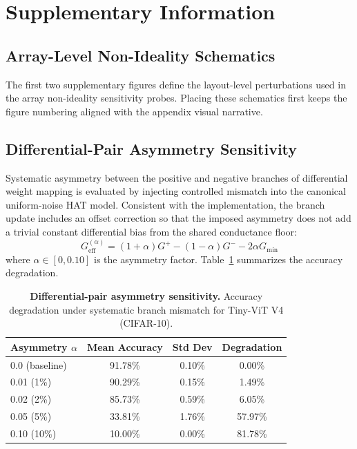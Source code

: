 \section{Supplementary Information}
\label{sec:supplementary}

\subsection{Array-Level Non-Ideality Schematics}
\label{subsec:supp-array-schematics}

The first two supplementary figures define the layout-level perturbations used in the array non-ideality sensitivity probes. Placing these schematics first keeps the figure numbering aligned with the appendix visual narrative.

\subsection{Differential-Pair Asymmetry Sensitivity}
\label{subsec:supp-asymmetry-sensitivity}

Systematic asymmetry between the positive and negative branches of differential weight mapping is evaluated by injecting controlled mismatch into the canonical uniform-noise HAT model. Consistent with the implementation, the branch update includes an offset correction so that the imposed asymmetry does not add a trivial constant differential bias from the shared conductance floor:
\begin{equation}
G^{(\alpha)}_{\mathrm{eff}} = (1+\alpha)G^{+} - (1-\alpha)G^{-} - 2\alpha G_{\min}
\end{equation}
where $\alpha \in [0, 0.10]$ is the asymmetry factor. Table~\ref{tab:asymmetry-sensitivity} summarizes the accuracy degradation.

\begin{table}[ht]
\centering
\caption{\textbf{Differential-pair asymmetry sensitivity.} Accuracy degradation under systematic branch mismatch for Tiny-ViT V4 (CIFAR-10).}
\label{tab:asymmetry-sensitivity}
\begin{tabular}{@{}lccc@{}}
\toprule
\textbf{Asymmetry $\alpha$} & \textbf{Mean Accuracy} & \textbf{Std Dev} & \textbf{Degradation} \\
\midrule
0.0 (baseline) & 91.78\% & 0.10\% & 0.00\% \\
0.01 (1\%) & 90.29\% & 0.15\% & 1.49\% \\
0.02 (2\%) & 85.73\% & 0.59\% & 6.05\% \\
0.05 (5\%) & 33.81\% & 1.76\% & 57.97\% \\
0.10 (10\%) & 10.00\% & 0.00\% & 81.78\% \\
\bottomrule
\end{tabular}
\end{table}

